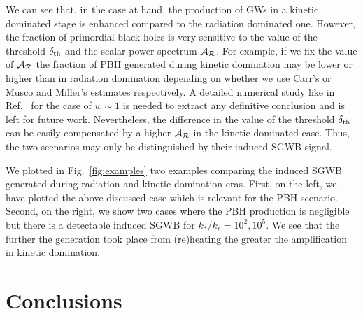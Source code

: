 \documentclass[aps,10pt,prd,groupedaddress,nofootinbib,notitlepage,eqsecnum,preprintnumbers]{revtex4-1}
\begin{document}
We can see that, in the case at hand, the production of GWs in a kinetic dominated stage is enhanced compared to the radiation dominated one. However, the fraction of primordial black holes is very sensitive to the value of the threshold $\delta_{\rm th}$ and the scalar power spectrum ${\cal A}_{\cal R}$. For example, if we fix the value of ${\cal A}_{\cal R}$ the fraction of PBH generated during kinetic domination may be lower or higher than in radiation domination depending on whether we use Carr's or Musco and Miller's estimates respectively. A detailed numerical study like in Ref.~\cite{Escriva:2019nsa} for the case of $w\sim 1$ is needed to extract any definitive conclusion and is left for future work. Nevertheless, the difference in the value of the threshold $\delta_{\rm th}$ can be easily compensated by a higher ${\cal A}_{\cal R}$ in the kinetic dominated case. Thus, the two scenarios may only be distinguished by their induced SGWB signal. %

We plotted in Fig.~\ref{fig:examples} two examples comparing the induced SGWB generated during radiation and kinetic domination eras. First, on the left, we have plotted the above discussed case which is relevant for the PBH scenario. Second, on the right, we show two cases where the PBH production is negligible but there is a detectable induced SGWB for $k_*/k_r=10^2,10^5$. We see that the further the generation took place from (re)heating the greater the amplification in kinetic domination.

\section{Conclusions\label{sec:conclusions}}
\end{document}
